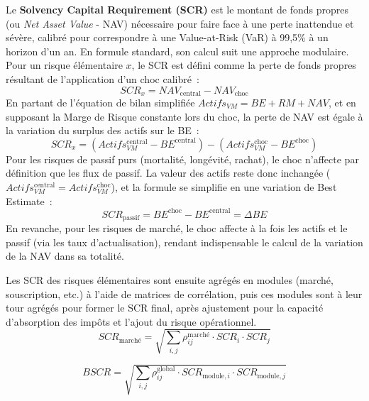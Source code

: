 Le \textbf{Solvency Capital Requirement (SCR)} est le montant de fonds propres (ou \textit{Net Asset Value} - NAV) nécessaire pour faire face à une perte inattendue et sévère, calibré pour correspondre à une Value-at-Risk (VaR) à 99,5\% à un horizon d'un an. En formule standard, son calcul suit une approche modulaire. Pour un risque élémentaire $x$, le SCR est défini comme la perte de fonds propres résultant de l'application d'un choc calibré~:
\begin{equation}
    SCR_{x} = NAV_{\text{central}} - NAV_{\text{choc}}
\end{equation}
En partant de l'équation de bilan simplifiée $Actifs_{VM} = BE + RM + NAV$, et en supposant la Marge de Risque constante lors du choc, la perte de NAV est égale à la variation du surplus des actifs sur le BE~:
\begin{equation*}
    SCR_{x} = (Actifs_{VM}^{\text{central}} - BE^{\text{central}}) - (Actifs_{VM}^{\text{choc}} - BE^{\text{choc}})
\end{equation*}
Pour les risques de passif purs (mortalité, longévité, rachat), le choc n'affecte par définition que les flux de passif. La valeur des actifs reste donc inchangée ($Actifs_{VM}^{\text{central}} = Actifs_{VM}^{\text{choc}}$), et la formule se simplifie en une variation de Best Estimate~:
\begin{equation*}
    SCR_{\text{passif}} = BE^{\text{choc}} - BE^{\text{central}} = \Delta BE
\end{equation*}
En revanche, pour les risques de marché, le choc affecte à la fois les actifs et le passif (via les taux d'actualisation), rendant indispensable le calcul de la variation de la NAV dans sa totalité.

\bigskip

Les SCR des risques élémentaires sont ensuite agrégés en modules (marché, souscription, etc.) à l'aide de matrices de corrélation, puis ces modules sont à leur tour agrégés pour former le SCR final, après ajustement pour la capacité d'absorption des impôts et l'ajout du risque opérationnel.
\begin{equation}
    SCR_{\text{marché}} = \sqrt{\sum_{i,j} \rho_{ij}^{\text{marché}} \cdot SCR_i \cdot SCR_j}
\end{equation}

\bigskip

\begin{equation}
    BSCR = \sqrt{\sum_{i,j} \rho_{ij}^{\text{global}} \cdot SCR_{\text{module}, i} \cdot SCR_{\text{module}, j}}
\end{equation}

